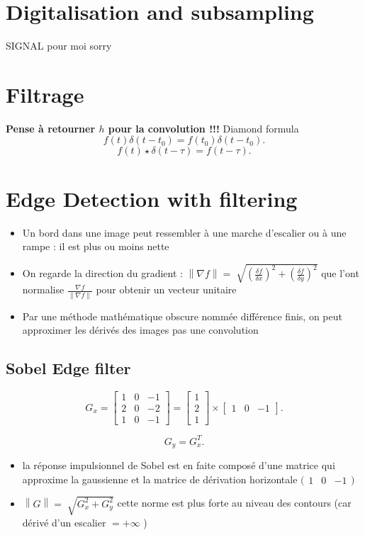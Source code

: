 \documentclass{article}
\theoremstyle{plain}%
\theoremstyle{definition}
\theoremstyle{remark}
\begin{document}
\section{Digitalisation and subsampling}
SIGNAL pour moi sorry

\section{Filtrage}
\textbf{Pense à retourner $ h $ pour la convolution !!!}
Diamond formula 
\[
    f(t)\delta (t-t_0) = f(t_0)\delta (t - t_0)
.\]
\[
    f(t) \star \delta (t - \tau) = f(t - \tau)
.\]


\section{Edge Detection with filtering}
\begin{itemize}
    \item Un bord dans une image peut ressembler à une marche d'escalier ou à une rampe : il est plus ou moins nette
    \item On regarde la direction du gradient : $ \left\| \nabla f \right\| = \sqrt[]{(\frac{\delta f}{\delta x})^2 + (\frac{\delta f}{\delta y})^2} $ que l'ont normalise $ \frac{\nabla f}{\left\| \nabla f \right\| } $ pour obtenir un vecteur unitaire
    \item Par une méthode mathématique obscure nommée différence finis, on peut approximer les dérivés des images pas une convolution 
\end{itemize}

\subsection{Sobel Edge filter}
\[
    G_x = \begin{bmatrix}
        1 & 0 & -1 \\
        2 & 0 & -2 \\
        1 & 0 & -1 
    \end{bmatrix} = \begin{bmatrix}
        1 \\
        2 \\
        1
    \end{bmatrix} \times \begin{bmatrix}
        1 & 0 & -1
    \end{bmatrix}
.\]

\[
    G_y = G_x^T
.\]


\begin{itemize}
    \item la réponse impulsionnel de Sobel est en faite composé d'une matrice qui approxime la gaussienne et la matrice de dérivation horizontale $ \big(\begin{smallmatrix}
        1 & 0 & -1
    \end{smallmatrix}\big) $ 
    \item $ \left\| G \right\| = \sqrt[]{G_x^2 + G_y^2} $ cette norme est plus forte au niveau des contours (car dérivé d'un escalier $ = + \infty  $ )
\end{itemize}
\end{document}
